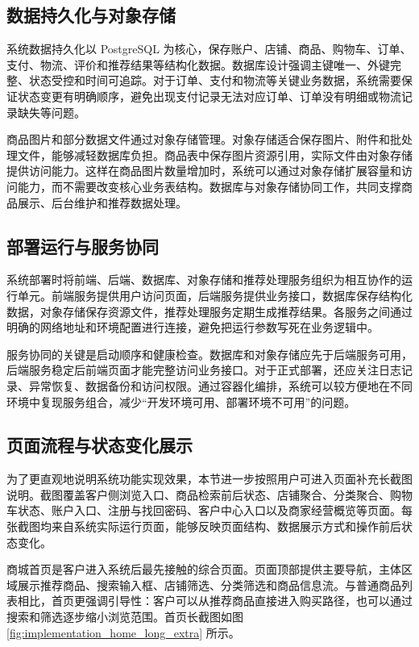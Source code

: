 ﻿\documentclass[oneside, UTF8]{ctexbook}
\begin{document}
\subsection{数据持久化与对象存储}

系统数据持久化以 PostgreSQL 为核心，保存账户、店铺、商品、购物车、订单、支付、物流、评价和推荐结果等结构化数据。数据库设计强调主键唯一、外键完整、状态受控和时间可追踪。对于订单、支付和物流等关键业务数据，系统需要保证状态变更有明确顺序，避免出现支付记录无法对应订单、订单没有明细或物流记录缺失等问题。

商品图片和部分数据文件通过对象存储管理。对象存储适合保存图片、附件和批处理文件，能够减轻数据库负担。商品表中保存图片资源引用，实际文件由对象存储提供访问能力。这样在商品图片数量增加时，系统可以通过对象存储扩展容量和访问能力，而不需要改变核心业务表结构。数据库与对象存储协同工作，共同支撑商品展示、后台维护和推荐数据处理。

\subsection{部署运行与服务协同}

系统部署时将前端、后端、数据库、对象存储和推荐处理服务组织为相互协作的运行单元。前端服务提供用户访问页面，后端服务提供业务接口，数据库保存结构化数据，对象存储保存资源文件，推荐处理服务定期生成推荐结果。各服务之间通过明确的网络地址和环境配置进行连接，避免把运行参数写死在业务逻辑中。

服务协同的关键是启动顺序和健康检查。数据库和对象存储应先于后端服务可用，后端服务稳定后前端页面才能完整访问业务接口。对于正式部署，还应关注日志记录、异常恢复、数据备份和访问权限。通过容器化编排，系统可以较方便地在不同环境中复现服务组合，减少“开发环境可用、部署环境不可用”的问题。

\subsection{页面流程与状态变化展示}

为了更直观地说明系统功能实现效果，本节进一步按照用户可进入页面补充长截图说明。截图覆盖客户侧浏览入口、商品检索前后状态、店铺聚合、分类聚合、购物车状态、账户入口、注册与找回密码、客户中心入口以及商家经营概览等页面。每张截图均来自系统实际运行页面，能够反映页面结构、数据展示方式和操作前后状态变化。

商城首页是客户进入系统后最先接触的综合页面。页面顶部提供主要导航，主体区域展示推荐商品、搜索输入框、店铺筛选、分类筛选和商品信息流。与普通商品列表相比，首页更强调引导性：客户可以从推荐商品直接进入购买路径，也可以通过搜索和筛选逐步缩小浏览范围。首页长截图如图 \ref{fig:implementation_home_long_extra} 所示。
\end{document}
